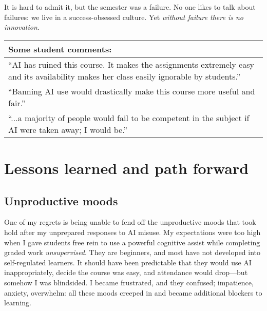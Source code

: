 \documentclass{tufte-handout}
\begin{document}
It is hard to admit it, but the semester was a failure. No one likes to talk about failures: we live in a success-obsessed culture. Yet \emph{without failure there is no innovation}.

\begin{table}[ht]
  \centering
  \selectfont
  \begin{tabularx}{\linewidth}{X}
    \toprule
    Some student comments: \\
    \midrule
    ``AI has ruined this course. It makes the assignments extremely easy and its availability makes her class easily ignorable by students.'' \\
    ``Banning AI use would drastically make this course more useful and fair.'' \\
    ``...a majority of people would fail to be competent in the subject if AI were taken away; I would be.''\\
    \bottomrule
  \end{tabularx}
  \label{tab:studentcomm}
\end{table}

\section{Lessons learned and path forward}

\subsection{Unproductive moods}

One of my regrets is being unable to fend off the unproductive moods that took hold after my unprepared responses to AI misuse. My expectations were too high when I gave students free rein to use a powerful cognitive assist while completing graded work \emph{unsupervised}. They are beginners, and most have not developed into self-regulated learners. It should have been predictable that they would use AI inappropriately, decide the course was easy, and attendance would drop---but somehow I was blindsided. I became frustrated, and they confused; impatience, anxiety, overwhelm: all these moods creeped in and became additional blockers to learning.\cite{denning2016learning}
\end{document}
